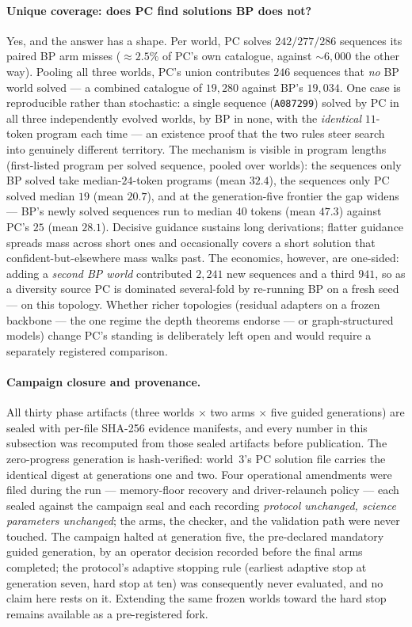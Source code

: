 \documentclass[11pt]{article}
\begin{document}
\paragraph{Unique coverage: does PC find solutions BP does not?}
Yes, and the answer has a shape. Per world, PC solves $242/277/286$ sequences its paired
BP arm misses ($\approx 2.5\%$ of PC's own catalogue, against $\sim 6{,}000$ the other
way). Pooling all three worlds, PC's union contributes $246$ sequences that \emph{no} BP
world solved --- a combined catalogue of $19{,}280$ against BP's $19{,}034$. One case is
reproducible rather than stochastic: a single sequence (\texttt{A087299}) solved by PC in
all three independently evolved worlds, by BP in none, with the \emph{identical}
$11$-token program each time --- an existence proof that the two rules steer search into
genuinely different territory. The mechanism is visible in program lengths (first-listed
program per solved sequence, pooled over worlds): the sequences only BP solved take
median-$24$-token programs (mean $32.4$), the sequences only PC solved median $19$ (mean
$20.7$), and at the generation-five frontier the gap widens --- BP's newly solved
sequences run to median $40$ tokens (mean $47.3$) against PC's $25$ (mean $28.1$).
Decisive guidance sustains long derivations; flatter guidance spreads mass across short
ones and occasionally covers a short solution that confident-but-elsewhere mass walks
past. The economics, however, are
one-sided: adding a \emph{second BP world} contributed $2{,}241$ new sequences and a third
$941$, so as a diversity source PC is dominated several-fold by re-running BP on a fresh
seed --- on this topology. Whether richer topologies (residual adapters on a frozen
backbone --- the one regime the depth theorems endorse --- or graph-structured models)
change PC's standing is deliberately left open and would require a separately registered
comparison.

\paragraph{Campaign closure and provenance.}
All thirty phase artifacts (three worlds $\times$ two arms $\times$ five guided
generations) are sealed with per-file SHA-256 evidence manifests, and every number in
this subsection was recomputed from those sealed artifacts before publication. The
zero-progress generation is hash-verified: world~3's PC solution file carries the
identical digest at generations one and two. Four operational amendments were filed
during the run --- memory-floor recovery and driver-relaunch policy --- each sealed
against the campaign seal and each recording \emph{protocol unchanged, science
parameters unchanged}; the arms, the checker, and the validation path were never
touched. The campaign halted at generation five, the pre-declared mandatory guided
generation, by an operator decision recorded before the final arms completed; the
protocol's adaptive stopping rule (earliest adaptive stop at generation seven, hard stop
at ten) was consequently never evaluated, and no claim here rests on it. Extending the
same frozen worlds toward the hard stop remains available as a pre-registered fork.
\end{document}
